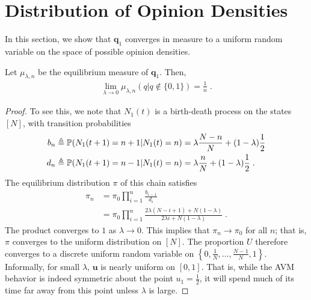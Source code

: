 \documentclass[final,supplement,onefignum,onetabnum]{siamart171218}
\begin{document}
\maketitle

\section{Distribution of Opinion Densities}
  In this section, we show that $\mathbf{q}_1$ converges in measure to a uniform random variable on the space of possible opinion densities. 
  \begin{lemma} \label{lm:uniform}

    Let $\mu_{\lambda,n}$ be the equilibrium measure of $\mathbf{q}_1$. 
    Then, 
    \begin{align}
       \lim_{\lambda \rightarrow 0}\mu_{\lambda, n}(q|q\notin \{0,1\}) = \frac{1}{n}\;.
    \end{align} 
  \end{lemma}
  \begin{proof}

    To see this, we note that $N_1(t)$ is a birth-death process on the states $[N]$, with transition probabilities
    \begin{align*}
      b_n &\triangleq \mathbb{P}(N_1(t+1) = n+1 | N_1(t) = n) = \lambda \frac{N - n}{N} + (1-\lambda)\frac{1}{2}\\ 
      d_n &\triangleq \mathbb{P}(N_1(t+1) = n-1 | N_1(t) = n) = \lambda \frac{n}{N} + (1-\lambda)\frac{1}{2}\;.
    \end{align*}
    The equilibrium distribution $\pi$ of this chain satisfies 
    \begin{align*}
      \pi_n &= \pi_0\prod_{i = 1}^n \frac{b_{i - 1}}{d_{i}}  \\ 
          &= \pi_0\prod_{i = 1}^n \frac{2\lambda (N-i+1) + N(1-\lambda)}{2\lambda i + N(1-\lambda)}\;. 
    \end{align*}
    The product converges to $1$ as $\lambda \rightarrow 0$. 
    This implies that $\pi_n \rightarrow \pi_0$ for all $n$; that is, $\pi$ converges to the uniform distribution on $[N]$. 
    The proportion $U$ therefore converges to a discrete uniform random variable on $\left\{0,\frac{1}{N}, \ldots,\frac{N-1}{N}, 1\right\}$. 
    Informally, for small $\lambda$, $\mathbf{u}$ is nearly uniform on $[0,1]$. 
    That is, while the AVM behavior is indeed symmetric about the point $u_1 = \frac{1}{2}$, it will spend much of its time far away from this point unless $\lambda$ is large. 
  \end{proof}
\end{document}
